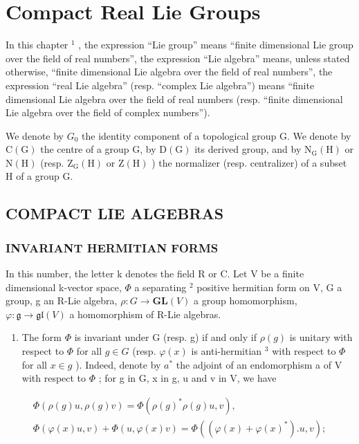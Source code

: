\chapter{Compact Real Lie Groups}

In this chapter \(^{1}\) , the expression ``Lie group'' means ``finite dimensional Lie group over the field of real numbers'', the expression ``Lie algebra'' means, unless stated otherwise, ``finite dimensional Lie algebra over the field of real numbers'', the expression ``real Lie algebra'' (resp. ``complex Lie algebra'') means ``finite dimensional Lie algebra over the field of real numbers (resp. ``finite dimensional Lie algebra over the field of complex numbers'').

We denote by \(G_{0}\) the identity component of a topological group G. We denote by \(\mathrm{C(G)}\) the centre of a group G, by \(\mathrm{D(G)}\) its derived group, and by \(\mathrm{N_{G}(H)}\) or \(\mathrm{N(H)}\) (resp. \(\mathrm{Z_{G}(H)}\) or \(\mathrm{Z(H)}\) ) the normalizer (resp. centralizer) of a subset H of a group G.

\section{COMPACT LIE ALGEBRAS}

\subsection{INVARIANT HERMITIAN FORMS}

In this number, the letter k denotes the field R or C. Let V be a finite dimensional k-vector space, \(\Phi\) a separating \(^{2}\) positive hermitian form on V, G a group, g an R-Lie algebra, \(\rho: G \to \mathbf{GL}(V)\) a group homomorphism, \(\varphi: \mathfrak{g} \to \mathfrak{gl}(V)\) a homomorphism of R-Lie algebras.

\begin{enumerate}
\def\labelenumi{\alph{enumi})}
\tightlist
\item
  The form \(\Phi\) is invariant under G (resp. g) if and only if \(\rho(g)\) is unitary with respect to \(\Phi\) for all \(g \in G\) (resp. \(\varphi(x)\) is anti-hermitian \(^{3}\) with respect to \(\Phi\) for all \(x \in g\) ). Indeed, denote by \(a^{*}\) the adjoint of an endomorphism a of V with respect to \(\Phi\) ; for g in G, x in g, u and v in V, we have
\end{enumerate}

\[
\begin{array}{c} \Phi (\rho (g) u, \rho (g) v) = \Phi (\rho (g) ^ {*} \rho (g) u, v), \\ \Phi (\varphi (x) u, v) + \Phi (u, \varphi (x) v) = \Phi ((\varphi (x) + \varphi (x) ^ {*}). u, v); \end{array}
\]

